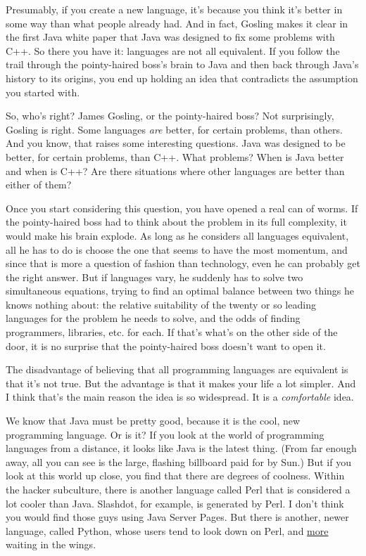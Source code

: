 \documentclass[12pt]{book}
\begin{document}
Presumably, if you create a new language, it's because you think it's
better in some way than what people already had. And in fact, Gosling
makes it clear in the first Java white paper that Java was designed to
fix some problems with C++. So there you have it: languages are not all
equivalent. If you follow the trail through the pointy-haired boss's
brain to Java and then back through Java's history to its origins, you
end up holding an idea that contradicts the assumption you started with.

So, who's right? James Gosling, or the pointy-haired boss? Not
surprisingly, Gosling is right. Some languages \emph{are} better, for
certain problems, than others. And you know, that raises some
interesting questions. Java was designed to be better, for certain
problems, than C++. What problems? When is Java better and when is C++?
Are there situations where other languages are better than either of
them?

Once you start considering this question, you have opened a real can of
worms. If the pointy-haired boss had to think about the problem in its
full complexity, it would make his brain explode. As long as he
considers all languages equivalent, all he has to do is choose the one
that seems to have the most momentum, and since that is more a question
of fashion than technology, even he can probably get the right answer.
But if languages vary, he suddenly has to solve two simultaneous
equations, trying to find an optimal balance between two things he knows
nothing about: the relative suitability of the twenty or so leading
languages for the problem he needs to solve, and the odds of finding
programmers, libraries, etc. for each. If that's what's on the other
side of the door, it is no surprise that the pointy-haired boss doesn't
want to open it.

The disadvantage of believing that all programming languages are
equivalent is that it's not true. But the advantage is that it makes
your life a lot simpler. And I think that's the main reason the idea is
so widespread. It is a \emph{comfortable} idea.

We know that Java must be pretty good, because it is the cool, new
programming language. Or is it? If you look at the world of programming
languages from a distance, it looks like Java is the latest thing. (From
far enough away, all you can see is the large, flashing billboard paid
for by Sun.) But if you look at this world up close, you find that there
are degrees of coolness. Within the hacker subculture, there is another
language called Perl that is considered a lot cooler than Java.
Slashdot, for example, is generated by Perl. I don't think you would
find those guys using Java Server Pages. But there is another, newer
language, called Python, whose users tend to look down on Perl, and
\href{accgen.html}{more} waiting in the wings.
\end{document}
